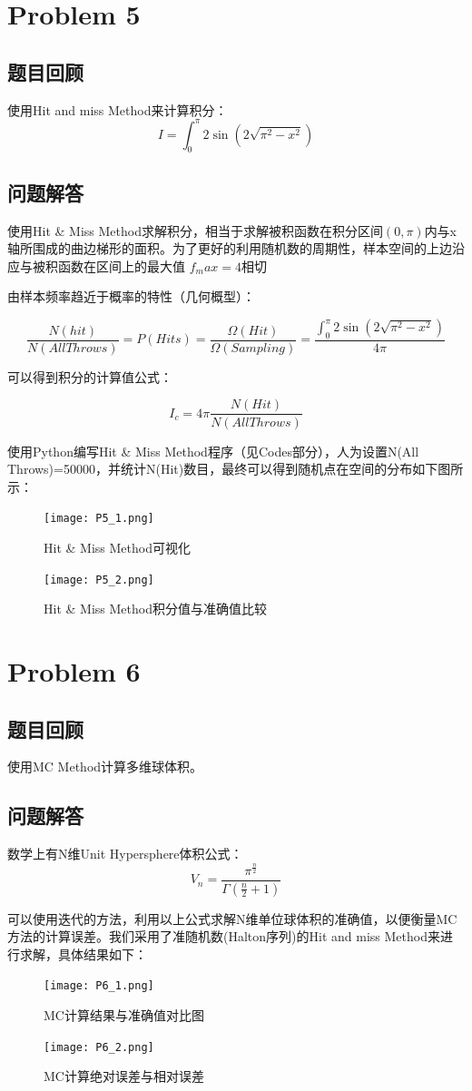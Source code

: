 \documentclass[12pt,a4paper]{article}%
\begin{document}
\section{Problem 5}
\subsection{题目回顾}
使用Hit and miss Method来计算积分：
\[I=\int_{0}^{\pi}2\sin \left(2\sqrt{\pi^2-x^2}\right)\]

\subsection{问题解答}
使用Hit \& Miss Method求解积分，相当于求解被积函数在积分区间$(0,\pi)$内与x轴所围成的曲边梯形的面积。为了更好的利用随机数的周期性，样本空间的上边沿应与被积函数在区间上的最大值 $f_max=4 $相切

由样本频率趋近于概率的特性（几何概型）：

\[\frac{N(hit)}{N(All Throws)}=P(Hits)=\frac{\Omega(Hit)}{\Omega(Sampling)}=\frac{\int_{0}^{\pi}2\sin \left(2\sqrt{\pi^2-x^2}\right)}{4\pi}\]

可以得到积分的计算值公式：

\[I_c=4\pi\frac{N(Hit)}{N(All Throws)}\]

使用Python编写Hit \& Miss Method程序（见Codes部分），人为设置N(All Throws)=50000，并统计N(Hit)数目，最终可以得到随机点在空间的分布如下图所示：

\begin{figure}[htbp]
    \centering
    \texttt{[image: P5\_1.png]}
    \caption{ Hit \& Miss Method可视化}
\end{figure}

\begin{figure}[htbp]
    \centering
    \texttt{[image: P5\_2.png]}
    \caption{Hit \& Miss Method积分值与准确值比较}
\end{figure}

\section{Problem 6}
\subsection{题目回顾}
使用MC Method计算多维球体积。
\subsection{问题解答}
数学上有N维Unit Hypersphere体积公式：
\[V_n=\frac{\pi^{\frac{n}{2}}}{\Gamma(\frac{n}{2}+1)}\]

可以使用迭代的方法，利用以上公式求解N维单位球体积的准确值，以便衡量MC方法的计算误差。我们采用了准随机数(Halton序列)的Hit and miss Method来进行求解，具体结果如下：

\begin{figure}[htbp]
    \centering
    \texttt{[image: P6\_1.png]}
    \caption{MC计算结果与准确值对比图}
\end{figure}

\begin{figure}[htbp]
    \centering
    \texttt{[image: P6\_2.png]}
    \caption{MC计算绝对误差与相对误差}
\end{figure}
\end{document}
